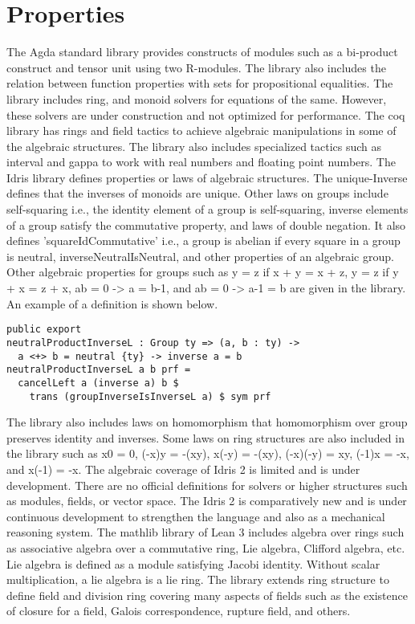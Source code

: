 \section{Properties}
The Agda standard library provides constructs of modules such as a bi-product
construct and tensor unit using two R-modules. The library also includes the
relation between function properties with  sets for propositional equalities.
The library includes ring, and monoid solvers for equations of the same.
However, these solvers are under construction and not optimized for performance.
The coq library has rings and field tactics to achieve algebraic manipulations
in some of the algebraic structures. The library also includes specialized
tactics such as interval and gappa to work with real numbers and floating point
numbers. \cite{Paulin-Mohring2012} The Idris library defines properties or laws
of algebraic structures. The unique-Inverse defines that the inverses of monoids
are unique. Other laws on groups include self-squaring i.e., the identity
element of a group is self-squaring, inverse elements of a group satisfy the
commutative property, and laws of double negation. It also defines
'squareIdCommutative' i.e., a group is abelian if every square in a group is
neutral, inverseNeutralIsNeutral, and other properties of an algebraic group.
Other algebraic properties for groups such as y = z if x + y = x + z, y = z if y
+ x = z + x, ab = 0 -> a = b-1, and ab = 0 -> a-1 = b are given in the library.
An example of a definition is shown below.
\begin{verbatim}
public export
neutralProductInverseL : Group ty => (a, b : ty) ->
  a <+> b = neutral {ty} -> inverse a = b
neutralProductInverseL a b prf =
  cancelLeft a (inverse a) b $
    trans (groupInverseIsInverseL a) $ sym prf
\end{verbatim}
The library also includes laws on homomorphism that homomorphism over group
preserves identity and inverses. Some laws on ring structures are also included
in the library such as x0 = 0, (-x)y = -(xy), x(-y) = -(xy), (-x)(-y) = xy,
(-1)x = -x, and x(-1) = -x. The algebraic coverage of Idris 2 is limited and is
under development. There are no official definitions for solvers or higher
structures such as modules, fields, or vector space. The Idris 2 is
comparatively new and is under continuous development to strengthen the language
and also as a mechanical reasoning system. The mathlib library of Lean 3
includes algebra over rings such as associative algebra over a commutative ring,
Lie algebra, Clifford algebra, etc. Lie algebra is defined as a module
satisfying Jacobi identity. Without scalar multiplication, a lie algebra is a
lie ring. The library extends ring structure to define field and division ring
covering many aspects of fields such as the existence of closure for a field,
Galois correspondence, rupture field, and others.